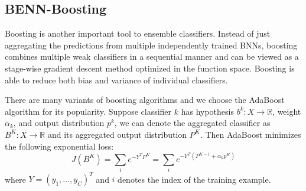 \documentclass[10pt,twocolumn,letterpaper]{article}
\begin{document}
\subsection{BENN-Boosting}  

Boosting is another important tool to ensemble classifiers. Instead of just aggregating the predictions from multiple independently trained BNNs, boosting combines multiple weak classifiers in a sequential manner and can be viewed as a stage-wise gradient descent method optimized in the function space. Boosting is able to reduce both bias and variance of individual classifiers.  %

There are many variants of boosting algorithms and we choose the AdaBoost~\cite{freund1995desicion} algorithm for its popularity. Suppose classifier $k$ has hypothesis $b^{k}:X \rightarrow \mathbb R$, weight $\alpha_{k}$, and output distribution $p^{k}$, we can denote the aggregated classifier as $B^{K}:X \rightarrow \mathbb R$ and its aggregated output distribution $P^{K}$. Then AdaBoost minimizes the following exponential loss:
\[
    J(B^{K}) = \sum_{i}e^{-Y^{T}P^{K}} = \sum_{i}e^{-Y^{T}(P^{K-1}+\alpha_{k}p^{K})}
\]
where $Y = (y_{1}, ..., y_{C})^{T}$ and $i$ denotes the index of the training example. %

\vspace{-4mm}
\end{document}
